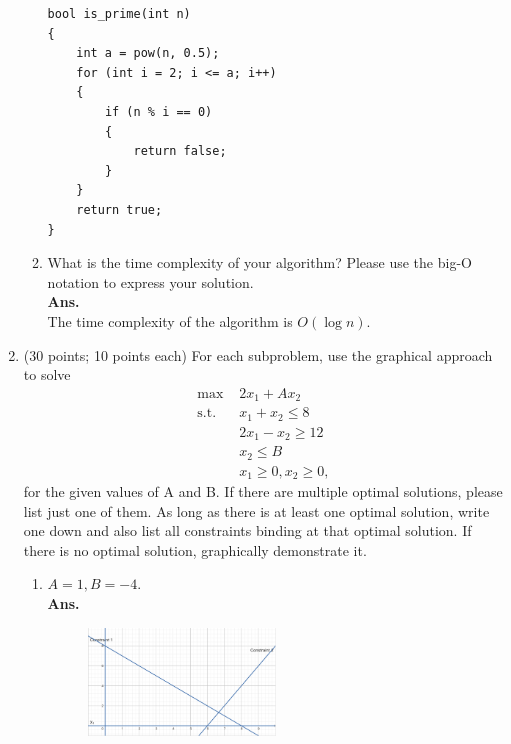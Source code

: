\documentclass[14pt]{article}
\begin{document}
\begin{enumerate}
\begin{enumerate}
                    \begin{lstlisting}[style=python]
bool is_prime(int n)
{
    int a = pow(n, 0.5);
    for (int i = 2; i <= a; i++)
    {
        if (n % i == 0)
        {
            return false;
        }
    }
    return true;
}
                    \end{lstlisting}
              \item What is the time complexity of your algorithm? Please use the big-O notation to express your solution.\\
                    \textbf{Ans.}\\
                    The time complexity of the algorithm is $O(\log n)$.
          \end{enumerate}
    \item (30 points; 10 points each) For each subproblem, use the graphical approach to solve
          \begin{align*}
              \text{max }  & 2x_1 +Ax_2              \\
              \text{s.t. } & x_1+x_2 \leq 8          \\
                           & 2x_1 - x_2 \geq 12      \\
                           & x_2 \leq B              \\
                           & x_1 \geq 0, x_2 \geq 0,
          \end{align*}
          for the given values of A and B. If there are multiple optimal solutions, please list just one of them. As long as there is at least one optimal solution, write one down and also list all constraints binding at that optimal solution. If there is no optimal solution, graphically demonstrate it.
          \begin{enumerate}
              \item $A=1,B=-4$.\\
                    \textbf{Ans. }
                    \begin{figure}[H]
                        \centering
                        \includegraphics[width=0.5\textwidth]{p3_a.png}
                    \end{figure}

\end{enumerate}
\end{enumerate}
\end{document}
